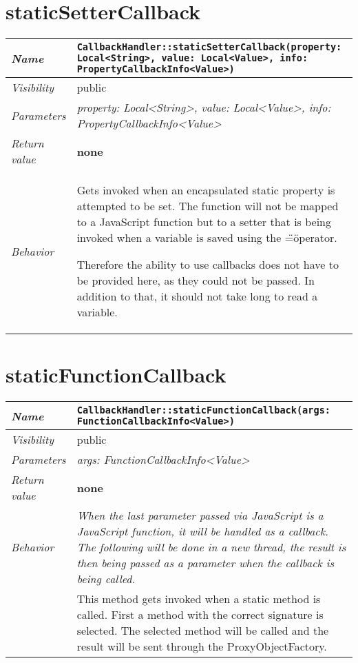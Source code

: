  \section{staticSetterCallback}
\begin{longtable}{p{3cm} @{\hskip 1cm} p{12cm}}
 \hline
\textit{Name} & \texttt{CallbackHandler::staticSetterCallback(property: Local<String>, value: Local<Value>, info: PropertyCallbackInfo<Value>)}\\
\hline
 \textit{Visibility} & public\\
\hline
\textit{Parameters} & \textit{property: Local<String>, value: Local<Value>, info: PropertyCallbackInfo<Value>}\\
\hline
\textit{Return value} & \textbf{none}\\
  \hline
 \textit{Behavior} & Gets invoked when an encapsulated static property is attempted to be set. The function will not be mapped to a JavaScript function but to a setter that is being invoked when a variable is saved using the \"=\" operator.

 Therefore the ability to use callbacks does not have to be provided here, as they could not be passed. In addition to that, it should not take long to read a variable. \\
\hline
\end{longtable} \pagebreak
 \section{staticFunctionCallback}
\begin{longtable}{p{3cm} @{\hskip 1cm} p{12cm}}
 \hline
\textit{Name} & \texttt{CallbackHandler::staticFunctionCallback(args: FunctionCallbackInfo<Value>)}\\
\hline
 \textit{Visibility} & public\\
\hline
\textit{Parameters} & \textit{args: FunctionCallbackInfo<Value>}\\
\hline
\textit{Return value} & \textbf{none}\\
  \hline
 \textit{Behavior} & \textit{When the last parameter passed via JavaScript is a JavaScript function, it will be handled as a callback. The following will be done in a new thread, the result is then being passed as a parameter when the callback is being called.}\\

 & This method gets invoked when a static method is called. First a method with the correct signature is selected.
 The selected method will be called and the result will be sent through the ProxyObjectFactory. \\
\hline
\end{longtable} \pagebreak
